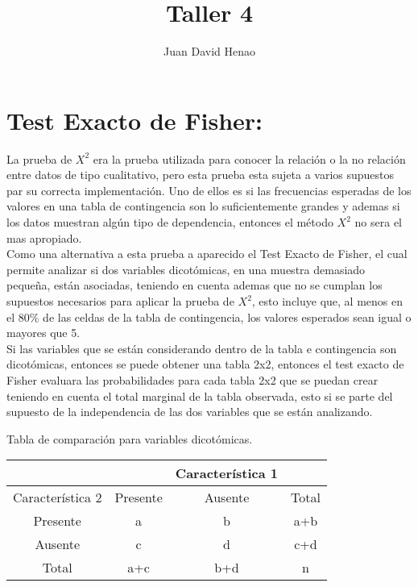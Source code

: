 \documentclass[12pt]{article}
\title{Taller 4}
\author{Juan David Henao}
\begin{document}


\maketitle

\section{Test Exacto de Fisher: }

La prueba de $X^2$ era la prueba utilizada para conocer la relación o la no relación entre datos de tipo cualitativo, pero esta prueba esta sujeta a varios supuestos par su correcta implementación. Uno de ellos es si las frecuencias esperadas de los valores en una tabla de contingencia son lo suficientemente grandes y ademas si los datos muestran algún tipo de dependencia, entonces el método $X^2$ no sera el mas apropiado.\\

Como una alternativa a esta prueba a aparecido el Test Exacto de Fisher, el cual permite analizar si dos variables dicotómicas, en una muestra demasiado pequeña, están asociadas, teniendo en cuenta ademas que no se cumplan los supuestos necesarios para aplicar la prueba de $X^2$, esto incluye que, al menos en el 80\% de las celdas de la tabla de contingencia, los valores esperados sean igual o mayores que 5.\\

Si las variables que se están considerando dentro de la tabla e contingencia son dicotómicas, entonces se puede obtener una tabla 2x2, entonces el test exacto de Fisher evaluara las probabilidades para cada tabla 2x2 que se puedan crear teniendo en cuenta el total marginal de la tabla observada, esto si se parte del supuesto de la independencia de las dos variables que se están analizando.\\

\begin{center}
Tabla de comparación para variables dicotómicas.
\begin{tabular}{c|ccc|}
\cline{2-4}
 &  & Característica 1 &  \\ 
\hline 
\multicolumn{1}{|c|}{Característica 2} & Presente & Ausente & Total \\ 
\hline 
\multicolumn{1}{|c|}{Presente} & a & b & a+b \\ 
\hline 
\multicolumn{1}{|c|}{Ausente} & c & d & c+d \\ 
\hline 
\multicolumn{1}{|c|}{Total} & a+c & b+d & n \\ 
\hline 
\end{tabular}
\end{center}
\end{document}
